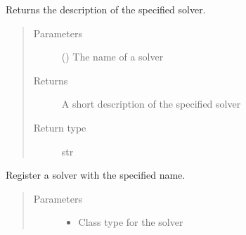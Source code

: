\documentclass[letterpaper,10pt,english]{sphinxmanual}
\begin{document}
\begin{fulllineitems}
\begin{fulllineitems}
\begin{quote}
\begin{description}
\end{description}\end{quote}

\end{fulllineitems}


\begin{fulllineitems}
\label{\detokenize{reference/solverapi:pao.common.solver.SolverFactory.description}}
Returns the description of the specified solver.
\begin{quote}\begin{description}
\item[{Parameters}] \leavevmode
{} () \textendash{} The name of a solver

\item[{Returns}] \leavevmode
A short description of the specified solver

\item[{Return type}] \leavevmode
str

\end{description}\end{quote}

\end{fulllineitems}


\begin{fulllineitems}
\label{\detokenize{reference/solverapi:pao.common.solver.SolverFactory.register}}
Register a solver with the specified name.
\begin{quote}\begin{description}
\item[{Parameters}] \leavevmode\begin{itemize}
\item {} 
 \textendash{} Class type for the solver


\end{itemize}
\end{description}
\end{quote}
\end{fulllineitems}
\end{fulllineitems}
\end{document}
